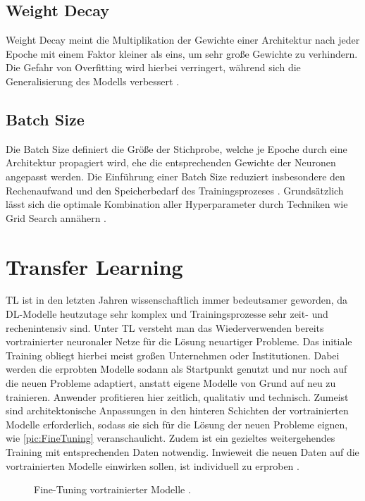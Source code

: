 \subsection{Weight Decay}
\noindent
Weight Decay meint die Multiplikation der Gewichte einer Architektur nach jeder Epoche mit einem Faktor kleiner als eins, um sehr große Gewichte zu verhindern. Die Gefahr von Overfitting wird hierbei verringert, während sich die Generalisierung des Modells verbessert \cite[S.~154]{ZHA20}.


\subsection{Batch Size}
\noindent
Die Batch Size definiert die Größe der Stichprobe, welche je Epoche durch eine Architektur propagiert wird, ehe die entsprechenden Gewichte der Neuronen angepasst werden. Die Einführung einer Batch Size reduziert insbesondere den Rechenaufwand und den Speicherbedarf des Trainingsprozeses \cite[S.~446]{ZHA20}. Grundsätzlich lässt sich die optimale Kombination aller Hyperparameter durch Techniken wie Grid Search annähern \cite[S.~24]{YAN20}.


\section{Transfer Learning}
\noindent
\ac{TL} ist in den letzten Jahren wissenschaftlich immer bedeutsamer geworden, da \ac{DL}-Modelle heutzutage sehr komplex und Trainingsprozesse sehr zeit- und rechenintensiv sind. Unter \ac{TL} versteht man das Wiederverwenden bereits vortrainierter neuronaler Netze für die Lösung neuartiger Probleme. Das initiale Training obliegt hierbei meist großen Unternehmen oder Institutionen. Dabei werden die erprobten Modelle sodann als Startpunkt genutzt und nur noch auf die neuen Probleme adaptiert, anstatt eigene Modelle von Grund auf neu zu trainieren. Anwender profitieren hier zeitlich, qualitativ und technisch. Zumeist sind architektonische Anpassungen in den hinteren Schichten der vortrainierten Modelle erforderlich, sodass sie sich für die Lösung der neuen Probleme eignen, wie \autoref{pic:FineTuning} veranschaulicht. Zudem ist ein gezieltes weitergehendes Training mit entsprechenden Daten notwendig. Inwieweit die neuen Daten auf die vortrainierten Modelle einwirken sollen, ist individuell zu erproben \cite[S.~554]{ZHA20}.

\begin{figure}[h]
  \centering
  \caption{Fine-Tuning vortrainierter Modelle \cite[S.~555]{ZHA20}.}
  \label{pic:FineTuning}
\end{figure}

